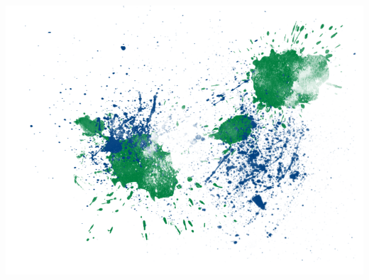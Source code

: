 \documentclass[11pt,twoside]{article}
\begin{document}
\includegraphics[width=\textwidth]{graphics/liquid_splatter_04.png}

\vfill





%
%



\appendix
%
%
\end{document}
